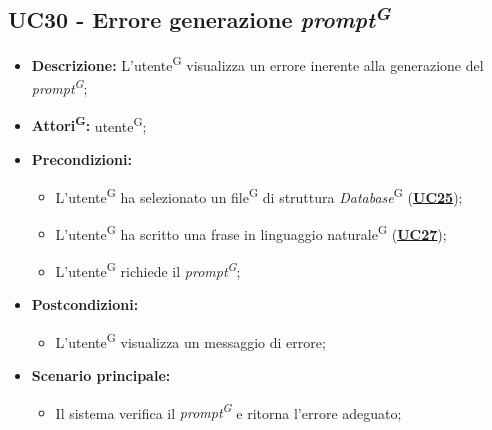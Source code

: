 \subsection{UC30 - Errore generazione \textit{prompt\textsuperscript{G}}}
\label{sec:UC30}
\begin{itemize}
	\item \textbf{Descrizione:} L’utente\textsuperscript{G} visualizza un errore inerente alla generazione del \textit{prompt\textsuperscript{G}};
	\item \textbf{Attori\textsuperscript{G}:} utente\textsuperscript{G};
	\item \textbf{Precondizioni:} 
	\begin{itemize}
		\item L’utente\textsuperscript{G} ha selezionato un file\textsuperscript{G} di struttura \textit{Database}\textsuperscript{G} (\hyperref[sec:UC25]{\textbf{UC25}});
		\item L’utente\textsuperscript{G} ha scritto una frase in linguaggio naturale\textsuperscript{G} (\hyperref[sec:UC27]{\textbf{UC27}});
		\item L’utente\textsuperscript{G} richiede il \textit{prompt\textsuperscript{G}};
	\end{itemize}
	\item \textbf{Postcondizioni:} 
	\begin{itemize}
		\item L’utente\textsuperscript{G} visualizza un messaggio di errore;
	\end{itemize}
	\item \textbf{Scenario principale:} 
	\begin{itemize}
		\item Il sistema verifica il \textit{prompt\textsuperscript{G}} e ritorna l'errore adeguato;
	\end{itemize}
\end{itemize}

